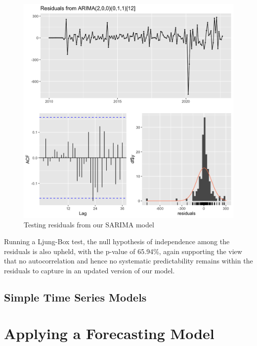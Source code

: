 \documentclass[conference]{IEEEtran}
\begin{document}
\begin{figure}[htbp]
\centerline{\includegraphics[scale=0.25]{SARIMA_residuals.png}}
\caption{Testing residuals from our SARIMA model}
\label{fig:SARIMA_residuals}
\end{figure}

Running a Ljung-Box test, the null hypothesis of independence among the residuals is also upheld, with the p-value of 65.94\%, again supporting the view that no autocorrelation and hence no systematic predictability remains within the residuals to capture in an updated version of our model.  


\subsection{Simple Time Series Models}

\section{Applying a Forecasting Model}
\end{document}

